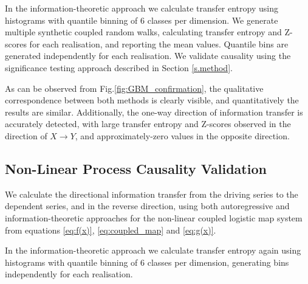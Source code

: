 \documentclass[]{rsos}%
\begin{document}
{  In the information-theoretic approach we calculate transfer entropy using histograms with quantile binning of 6 classes per dimension. We generate multiple synthetic coupled random walks, calculating transfer entropy and Z-scores for each realisation, and reporting the mean values. Quantile bins are generated independently for each realisation. We validate causality using the significance testing approach described in Section \ref{s.method}.

  As can be observed from Fig.\ref{fig:GBM_confirmation}, the qualitative correspondence between both methods is clearly visible, and quantitatively the results are similar. Additionally, the one-way direction of information transfer is accurately detected, with large transfer entropy and Z-scores observed in the direction of $X \rightarrow Y$, and approximately-zero values in the opposite direction.


    

 
  \subsection{Non-Linear Process Causality Validation}

  We calculate the directional information transfer from the driving series to the dependent series, and in the reverse direction, using both autoregressive and information-theoretic approaches for the non-linear coupled logistic map system from equations \ref{eq:f(x)}, \ref{eq:coupled_map} and \ref{eq:g(x)}.  

  In the information-theoretic approach we calculate transfer entropy again using histograms with quantile binning of 6 classes per dimension, generating bins independently for each realisation.
  

}
\end{document}
